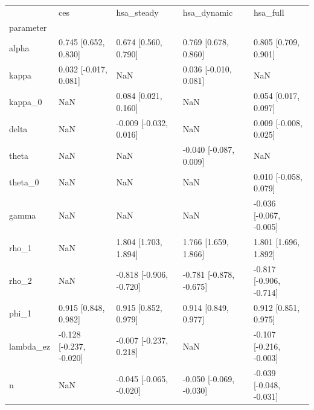 \begin{tabular}{lllll}
\toprule
 & ces & hsa\_steady & hsa\_dynamic & hsa\_full \\
parameter &  &  &  &  \\
\midrule
alpha & 0.745 [0.652, 0.830] & 0.674 [0.560, 0.790] & 0.769 [0.678, 0.860] & 0.805 [0.709, 0.901] \\
kappa & 0.032 [-0.017, 0.081] & NaN & 0.036 [-0.010, 0.081] & NaN \\
kappa\_0 & NaN & 0.084 [0.021, 0.160] & NaN & 0.054 [0.017, 0.097] \\
delta & NaN & -0.009 [-0.032, 0.016] & NaN & 0.009 [-0.008, 0.025] \\
theta & NaN & NaN & -0.040 [-0.087, 0.009] & NaN \\
theta\_0 & NaN & NaN & NaN & 0.010 [-0.058, 0.079] \\
gamma & NaN & NaN & NaN & -0.036 [-0.067, -0.005] \\
rho\_1 & NaN & 1.804 [1.703, 1.894] & 1.766 [1.659, 1.866] & 1.801 [1.696, 1.892] \\
rho\_2 & NaN & -0.818 [-0.906, -0.720] & -0.781 [-0.878, -0.675] & -0.817 [-0.906, -0.714] \\
phi\_1 & 0.915 [0.848, 0.982] & 0.915 [0.852, 0.979] & 0.914 [0.849, 0.977] & 0.912 [0.851, 0.975] \\
lambda\_ez & -0.128 [-0.237, -0.020] & -0.007 [-0.237, 0.218] & NaN & -0.107 [-0.216, -0.003] \\
n & NaN & -0.045 [-0.065, -0.020] & -0.050 [-0.069, -0.030] & -0.039 [-0.048, -0.031] \\
\bottomrule
\end{tabular}

